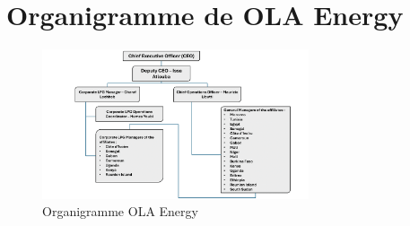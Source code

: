 \documentclass[a4paper, oneside, 12pt, final]{extreport}
\begin{document}
\section{Organigramme de OLA Energy}
\begin{figure}[h]
    \centering
    \includegraphics[width=0.7\textwidth]{Organigramme OLA Energy-1.png} %
    \caption{Organigramme OLA Energy}
    \label{fig:Organigramme OLA Energy}
\end{figure}
\newpage
\end{document}
